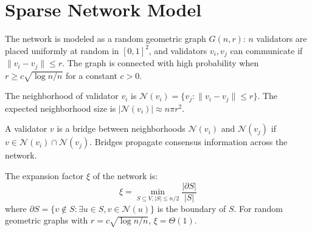 \section{Sparse Network Model}

\label{sec:nebula-model}

\begin{definition}
The network is modeled as a random geometric graph $G(n, r)$: $n$ validators are
placed uniformly at random in $[0, 1]^2$, and validators $v_i, v_j$ can communicate
if $\|v_i - v_j\| \leq r$. The graph is connected with high probability when
$r \geq c\sqrt{\log n / n}$ for a constant $c > 0$.
\end{definition}

\begin{definition}[Neighborhood]
The neighborhood of validator $v_i$ is $\mathcal{N}(v_i) = \{v_j : \|v_i - v_j\| \leq r\}$.
The expected neighborhood size is $|\mathcal{N}(v_i)| \approx n \pi r^2$.
\end{definition}

\begin{definition}
A validator $v$ is a bridge between neighborhoods $\mathcal{N}(v_i)$ and $\mathcal{N}(v_j)$
if $v \in \mathcal{N}(v_i) \cap \mathcal{N}(v_j)$. Bridges propagate consensus information
across the network.
\end{definition}

\begin{definition}
The expansion factor $\xi$ of the network is:
\[
\xi = \min_{S \subseteq V, |S| \leq n/2} \frac{|\partial S|}{|S|}
\]
where $\partial S = \{v \notin S : \exists u \in S, v \in \mathcal{N}(u)\}$ is the
boundary of $S$. For random geometric graphs with $r = c\sqrt{\log n / n}$, $\xi = \Theta(1)$.
\end{definition}

